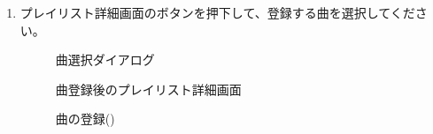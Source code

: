 \begin{enumerate}
            \newpage
            \item プレイリスト詳細画面の\ttbox{+}ボタンを押下して、登録する曲を選択してください。
                \begin{figure}[htbp]
                    \begin{minipage}[b]{0.45\linewidth}
                        \centering
                        \caption{曲選択ダイアログ}
                        \label{img:playlist4}
                    \end{minipage}
                    \begin{minipage}[b]{0.45\linewidth}
                        \centering
                        \caption{曲登録後のプレイリスト詳細画面}
                        \label{img:playlist5}
                    \end{minipage}
                    \caption*{曲の登録(\currentVersion)}
                \end{figure}


\end{enumerate}

